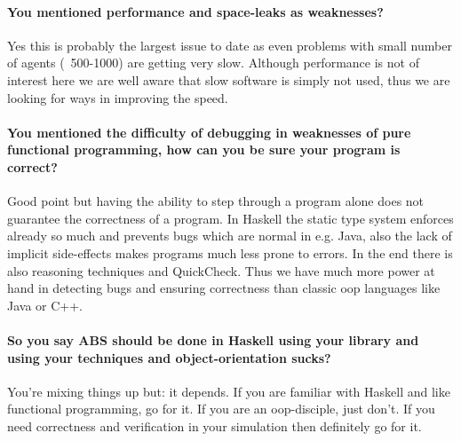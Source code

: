 \paragraph{You mentioned performance and space-leaks as weaknesses?}
Yes this is probably the largest issue to date as even problems with small number of agents (~500-1000) are getting very slow. Although performance is not of interest here we are well aware that slow software is simply not used, thus we are looking for ways in improving the speed.

\paragraph{You mentioned the difficulty of debugging in weaknesses of pure functional programming, how can you be sure your program is correct?}
Good point but having the ability to step through a program alone does not guarantee the correctness of a program. In Haskell the static type system enforces already so much and prevents bugs which are normal in e.g. Java, also the lack of implicit side-effects makes programs much less prone to errors. In the end there is also reasoning techniques and QuickCheck. Thus we have much more power at hand in detecting bugs and ensuring correctness than classic oop languages like Java or C++.

\paragraph{So you say ABS should be done in Haskell using your library and using your techniques and object-orientation sucks?}
You're mixing things up but: it depends. If you are familiar with Haskell and like functional programming, go for it. If you are an oop-disciple, just don't. If you need correctness and verification in your simulation then definitely go for it.